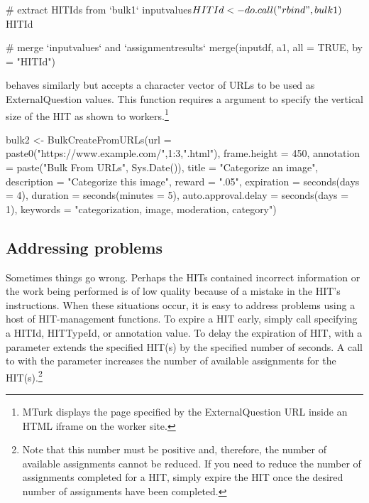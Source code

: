 \begin{example}
# extract HITIds from `bulk1`
inputvalues$HITId <- do.call("rbind", bulk1)$HITId

# merge `inputvalues` and `assignmentresults`
merge(inputdf, a1, all = TRUE, by = "HITId")
\end{example}

 behaves similarly but accepts a character vector of URLs to be used as ExternalQuestion values. This function requires a  argument to specify the vertical size of the HIT as shown to workers.\footnote{MTurk displays the page specified by the ExternalQuestion URL inside an HTML iframe on the worker site.}


\begin{example}
bulk2 <- 
BulkCreateFromURLs(url = paste0("https://www.example.com/",1:3,".html"),
                   frame.height = 450,
                   annotation = paste("Bulk From URLs", Sys.Date()),
                   title = "Categorize an image",
                   description = "Categorize this image",
                   reward = ".05",
                   expiration = seconds(days = 4),
                   duration = seconds(minutes = 5),
                   auto.approval.delay = seconds(days = 1),
                   keywords = "categorization, image, moderation, category")
\end{example}



\subsection{Addressing problems}

Sometimes things go wrong. Perhaps the HITs contained incorrect information or the work being performed is of low quality because of a mistake in the HIT's instructions. When these situations occur, it is easy to address problems using a host of HIT-management functions. To expire a HIT early, simply call  specifying a HITId, HITTypeId, or annotation value. To delay the expiration of HIT,  with a  parameter extends the specified HIT(s) by the specified number of seconds. A call to  with the  parameter increases the number of available assignments for the HIT(s).\footnote{Note that this number must be positive and, therefore, the number of available assignments cannot be reduced. If you need to reduce the number of assignments completed for a HIT, simply expire the HIT once the desired number of assignments have been completed.}

